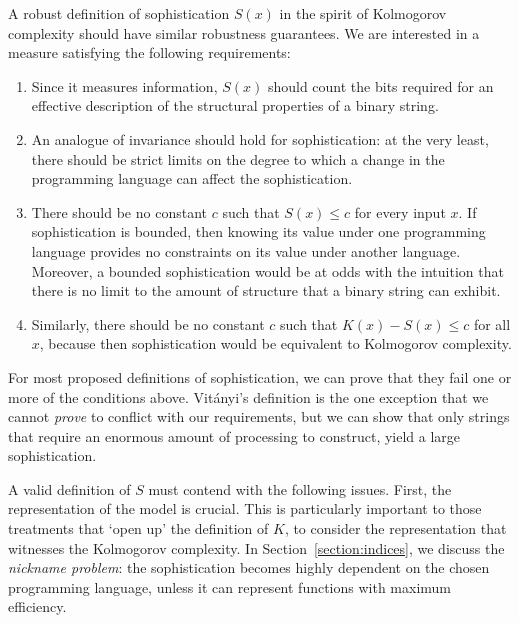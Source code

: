 \documentclass{style/llncs}
\begin{document}
A robust definition of sophistication $S(x)$ in the spirit of Kolmogorov complexity should have similar robustness guarantees. We are interested in a measure satisfying the following requirements:

\begin{enumerate}
\item Since it measures information, $S(x)$ should count the bits required for an effective description of the structural properties of a binary string.
\item An analogue of invariance should hold for sophistication: at the very least, there should be strict limits on the degree to which a change in the programming language can affect the sophistication.
\item There should be no constant $c$ such that $S(x)\le c$ for every input $x$. If sophistication is bounded, then knowing its value under one programming language provides no constraints on its value under another language. Moreover, a bounded sophistication would be at odds with the intuition that there is no limit to the amount of structure that a binary string can exhibit.
\item Similarly, there should be no constant $c$ such that $K(x)-S(x)\le c$ for all $x$, because then sophistication would be equivalent to Kolmogorov complexity. 
\end{enumerate}
For most proposed definitions of sophistication, we can prove that they fail one or more of the conditions above. Vit\'anyi's definition \cite{vitanyi2004meaningful} is the one exception that we cannot \emph{prove} to conflict with our requirements, but we can show that only strings that require an enormous amount of processing to construct, yield a large sophistication.

A valid definition of $S$ must contend with the following issues. First, the representation of the model is crucial. This is particularly important to those treatments that `open up' the definition of $K$, to consider the representation that witnesses the Kolmogorov complexity. In Section~\ref{section:indices}, we discuss the \emph{nickname problem}: the sophistication becomes highly dependent on the chosen programming language, unless it can represent functions with maximum efficiency. 
\end{document}
